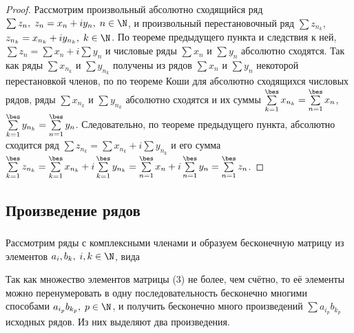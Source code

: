 \documentclass[a4paper]{article}
\begin{document}
\begin{proof}
Рассмотрим произвольный абсолютно сходящийся ряд $\sum z_n, \;
z_n=x_n+iy_n, \; n\in\N$, и произвольный перестановочный ряд $\sum
z_{n_k}$, $z_{n_k}=x_{n_k} + iy_{n_k}, \; k\in\N$. По теореме
предыдущего пункта и следствия к ней, $\sum z_n = \sum x_n + i\sum
y_n$ и числовые ряды $\sum x_n$ и $\sum y_n$ абсолютно сходятся. Так
как ряды $\sum x_{n_k}$ и $\sum y_{n_k}$ получены из рядов $\sum
x_n$ и $\sum y_n$ некоторой перестановкой членов, по по теореме Коши
для абсолютно сходящихся числовых рядов, ряды $\sum x_{n_k}$ и $\sum
y_{n_k}$ абсолютно сходятся и их суммы $\sum\limits_{k=1}^{\bes}
x_{n_k} = \sum\limits_{n=1}^{\bes} x_n$, $\sum\limits_{k=1}^{\bes}
y_{n_k} = \sum\limits_{n=1}^{\bes} y_n$. Следовательно, по теореме
предыдущего пункта, абсолютно сходится ряд $\sum z_{n_k} = \sum
x_{n_k} + i\sum y_{n_k}$ и его сумма $\sum\limits_{k=1}^{\bes}
z_{n_k} = \sum\limits_{k=1}^{\bes} x_{n_k} +
i\sum\limits_{k=1}^{\bes} y_{n_k} = \sum\limits_{n=1}^{\bes} x_n +
i\sum\limits_{n=1}^{\bes} y_n = \sum\limits_{n=1}^{\bes} z_n$.
\end{proof}

\subsection{Произведение рядов}

\subsubsection{}

Рассмотрим ряды с комплексными членами   и образуем бесконечную матрицу из
элементов $a_i,b_k, \; i,k\in\N$, вида 

Так как множество элементов матрицы (3) не более, чем счётно, то её
элементы можно перенумеровать в одну последовательность бесконечно
многими способами $a_{i_p} b_{k_p}, \; p\in\N$, и получить
бесконечно много произведений $\sum a_{i_p} b_{k_p}$ исходных рядов.
Из них выделяют два произведения.
\end{document}
